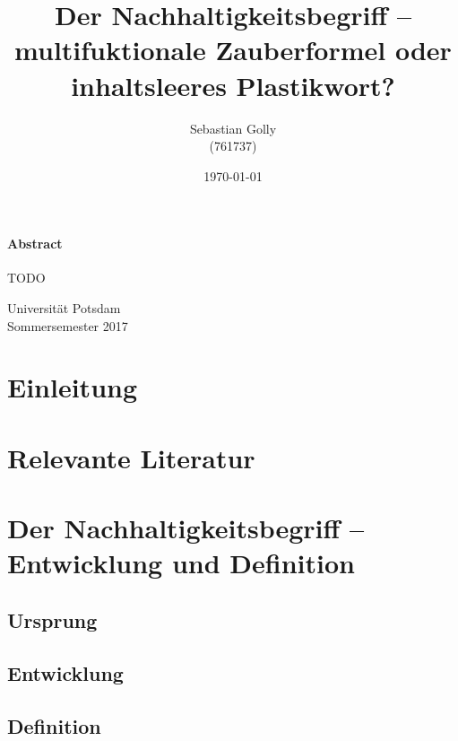 \documentclass[
    german,
    a4paper,%
    12pt,%
    oneside,%
    toc=bibliography,
    final,
]{scrartcl}
\title{Der Nachhaltigkeitsbegriff – multifuktionale Zauberformel oder inhaltsleeres Plastikwort?}
\subtitle{}
\author{Sebastian Golly\\ {\normalsize (761737)}}
\date{\today}
\begin{document}
\maketitle

\vfill

\paragraph{Abstract}

TODO 
\\[3em]

\vfill

\begin{center}
Universität Potsdam\\[1.5em]
Sommersemester 2017
\end{center}

\thispagestyle{empty}
\newpage


\section{Einleitung}
\label{sec:einleitung}



\section{Relevante Literatur}
\label{sec:rel-literatur}


\section{Der Nachhaltigkeitsbegriff – Entwicklung und Definition}
\label{sec:entwicklung-definition}

\subsection{Ursprung}
\label{subsec:ursprung}

\subsection{Entwicklung}
\label{subsec:entwicklung}

\subsection{Definition}
\label{subsec:definition}
\end{document}
